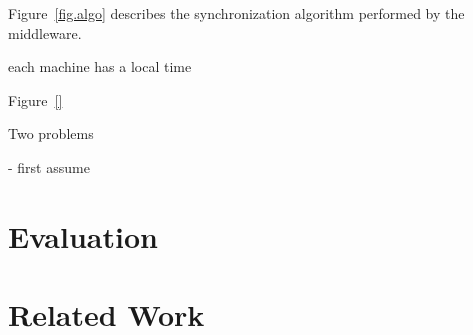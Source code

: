 \documentclass[sigplan,screen]{acmart}
\begin{document}
Figure~\ref{fig.algo} describes the synchronization algorithm performed by the
middleware.

each machine has a local time

Figure~\ref{}

Two problems


- first assume

\section{Evaluation}
\label{sec.eval}


\section{Related Work}
\label{sec.related}
\end{document}
